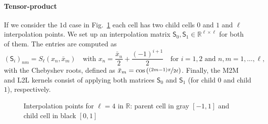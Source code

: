 \documentclass[]{article}
\newcommand{\Mat}[1]{\mathsf{#1}}  %
\theoremstyle{plain}
\begin{document}
\paragraph{Tensor-product}
If we consider the $1$d case in Fig.~\ref{fig:1dm2m} each cell has two child
cells $0$ and $1$ and $\ell$ interpolation points. We set up an interpolation
matrix $\Mat{S}_0, \Mat{S}_1 \in \mathbb{R}^{\ell\times\ell}$ for both of
them. The entries are computed as
\begin{equation}
  \label{eq:interpolmatrixentries}
  (\Mat{S}_i)_{nm} = S_\ell(x_n,\bar x_m)
  \quad \text{with } x_n = \frac{\bar x_n }{2} + \frac{(-1)^{i+1}}{2} \quad
  \text{for } i=1,2 \text{ and } n,m=1,\dots,\ell,
\end{equation}
with the Chebyshev roots, defined as $\bar x_m =
\cos\left(\nicefrac{(2m-1)\pi}{2\ell}\right)$. Finally, the M2M and L2L
kernels consist of applying both matrices $\Mat{S}_0$ and $\Mat{S}_1$ (for
child $0$ and child $1$), respectively.
\begin{figure}[htbp]
  \centering
  \caption{Interpolation points for $\ell=4$ in $\mathbb{R}$: parent cell in
    gray $[-1,1]$ and child cell in black $[0,1]$}
  \label{fig:1dm2m}
\end{figure}
\end{document}

